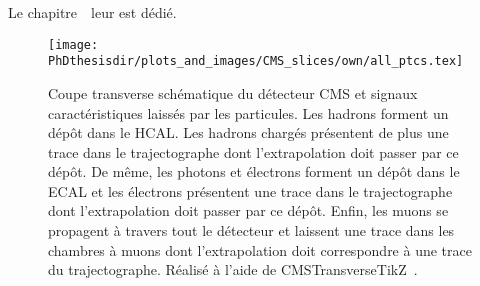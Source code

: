 Le chapitre~\ leur est dédié.
\begin{figure}[b]
\texttt{[image: \\PhDthesisdir/plots\_and\_images/CMS\_slices/own/all\_ptcs.tex]}
\caption[Coupe transverse schématique du détecteur CMS.]{Coupe transverse schématique du détecteur CMS et signaux caractéristiques laissés par les particules. Les hadrons forment un dépôt dans le HCAL. Les hadrons chargés présentent de plus une trace dans le trajectographe dont l'extrapolation doit passer par ce dépôt. De même, les photons et électrons forment un dépôt dans le ECAL et les électrons présentent une trace dans le trajectographe dont l'extrapolation doit passer par ce dépôt. Enfin, les muons se propagent à travers tout le détecteur et laissent une trace dans les chambres à muons dont l'extrapolation doit correspondre à une trace du trajectographe. Réalisé à l'aide de CMSTransverseTikZ~\cite{CMSTransverseTikZ}.}
\label{fig-chapter-LHC-section-evt_reco-cms_slice}
\end{figure}

